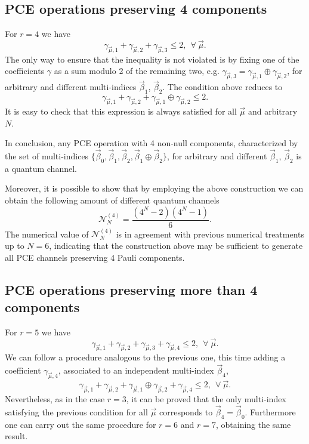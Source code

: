 \subsection{PCE operations preserving 4 components}
% 
For $r=4$ we have
% 
\begin{equation}
 \gamma_{\vec{\mu}, 1} + \gamma_{\vec{\mu}, 2} + \gamma_{\vec{\mu}, 3} \leq 2, ~~\forall ~ \vec{\mu}.
\label{Eq7}
 \end{equation}
%
The only way to ensure that the inequality is not violated is by fixing one of the coefficients $\gamma$ as a sum modulo 2 of the remaining two, e.g. $\gamma_{\vec{\mu}, 3}=\gamma_{\vec{\mu}, 1}\oplus \gamma_{\vec{\mu}, 2}$, for arbitrary and different multi-indices $\vec{\beta}_{1}$, $\vec{\beta}_{2}$. The condition above reduces to 
% 
\begin{equation}
 \gamma_{\vec{\mu}, 1} + \gamma_{\vec{\mu}, 2} + \gamma_{\vec{\mu}, 1}\oplus\gamma_{\vec{\mu}, 2} \leq 2.
\label{Eq8}
 \end{equation}
%
It is easy to check that this expression is always satisfied for all $\vec{\mu}$ and arbitrary $N$. 

In conclusion, any PCE operation with 4 non-null components, characterized by the set of multi-indices $\{\vec{\beta}_{0},\vec{\beta}_{1},\vec{\beta}_{2},\vec{\beta}_{1}\oplus\vec{\beta}_{2}\}$, for arbitrary and different $\vec{\beta}_{1}$, $\vec{\beta}_{2}$ is a quantum channel. 

Moreover, it is possible to show that by employing the above construction we can obtain the following amount of different quantum channels
% 
\begin{equation}
 \mathcal{N}^{(4)}_N=\frac{(4^N-2)(4^N-1)}{6}.
\label{Eq9}
 \end{equation}
% 
The numerical value of $\mathcal{N}^{(4)}_N$ is in agreement with previous numerical treatments up to $N=6$, indicating that the construction above may be sufficient to generate all PCE channels preserving 4 Pauli components.

\subsection{PCE operations preserving more than 4 components}
% 
For $r=5$ we have
% 
\begin{equation}
 \gamma_{\vec{\mu}, 1} + \gamma_{\vec{\mu}, 2} + \gamma_{\vec{\mu}, 3} + \gamma_{\vec{\mu}, 4}\leq 2, ~~\forall ~ \vec{\mu}.
\label{Eq11}
 \end{equation}
%  
We can follow a procedure analogous to the previous one, this time adding a coefficient $\gamma_{\vec{\mu}, 4}$, associated to an independent multi-index $\vec{\beta}_{4}$,
% 
\begin{equation}
 \gamma_{\vec{\mu}, 1} + \gamma_{\vec{\mu}, 2} + \gamma_{\vec{\mu}, 1}\oplus\gamma_{\vec{\mu}, 2} + \gamma_{\vec{\mu}, 4}\leq 2,  ~~\forall ~ \vec{\mu}.
\label{Eq12}
 \end{equation}
% 
Nevertheless, as in the case $r=3$, it can be proved that the only multi-index satisfying the previous condition for all $\vec{\mu}$ corresponds to $\vec{\beta}_{4}=\vec{\beta}_{0}$. Furthermore one can carry out the same procedure for $r=6$ and $r=7$, obtaining the same result.

